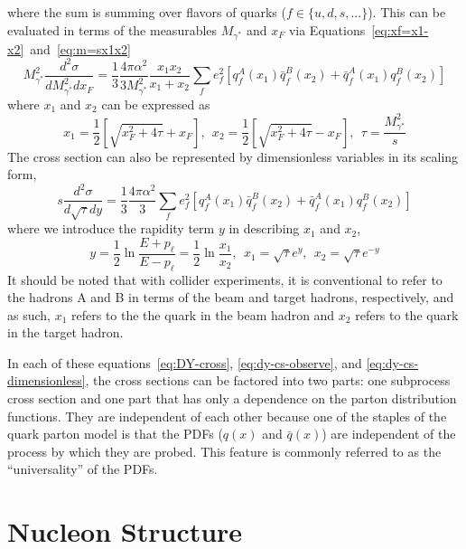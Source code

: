 where the sum is summing over flavors of quarks ($f\in\{u,d,s,...\}$). This can be evaluated in terms of the measurables $M_{\gamma^*}$ and $x_F$ via Equations~\ref{eq:xf=x1-x2}~and~\ref{eq:m=sx1x2}
\begin{equation}
M_{\gamma^*}^2 \frac{d^2\sigma}{dM_{\gamma^*}^2 dx_F} = 
\frac{1}{3}\frac{4\pi\alpha^2}{3M_{\gamma^*}^2}
\frac{x_1 x_2}{x_1 + x_2}
\sum_{f}e_f^2[q_f^A(x_1)\bar{q}_f^B(x_2)+
\bar{q}_f^A(x_1)q_f^B(x_2)]
\label{eq:dy-cs-observe}
\end{equation}
where $x_1$ and $x_2$ can be expressed as
\begin{equation}
x_1 = \frac{1}{2}\left[\sqrt{x_F^2 + 4\tau} + x_F\right],\ \  
x_2 = \frac{1}{2}\left[\sqrt{x_F^2 + 4\tau} - x_F\right],\ \ 
\tau = \frac{M_{\gamma^*}^2}{s}
\end{equation}
The cross section can also be represented by dimensionless variables in its scaling form,
\begin{equation}
s \frac{d^2\sigma}{d \sqrt{\tau} dy} = 
\frac{1}{3}\frac{4\pi\alpha^2}{3}
\sum_{f}e_f^2[q_f^A(x_1)\bar{q}_f^B(x_2)+
\bar{q}_f^A(x_1)q_f^B(x_2)]
\label{eq:dy-cs-dimensionless}
\end{equation}
where we introduce the rapidity term $y$ in describing $x_1$ and $x_2$,
\begin{equation}
y  = \frac{1}{2} \ln \frac{E+ p_\ell}{E-p_\ell} = \frac{1}{2} \ln \frac{x_1}{x_2},\ \ 
x_1  = \sqrt{\tau} e^{y},\ \  
x_2  = \sqrt{\tau} e^{-y}
\end{equation}
It should be noted that with collider experiments, it is conventional to refer to the hadrons A and B in terms of the beam and target hadrons, respectively, and as such, $x_1$ refers to the the quark in the beam hadron and $x_2$ refers to the quark in the target hadron.

In each of these equations~\ref{eq:DY-cross}, \ref{eq:dy-cs-observe}, and \ref{eq:dy-cs-dimensionless}, the cross sections can be factored into two parts: one subprocess cross section and one part that has only a dependence on the parton distribution functions. They are independent of each other because one of the staples of the quark parton model is that the PDFs ($q(x)$ and $\bar{q}(x)$) are independent of the process by which they are probed. This feature is commonly referred to as the ``universality'' of the PDFs.

\section{Nucleon Structure}

